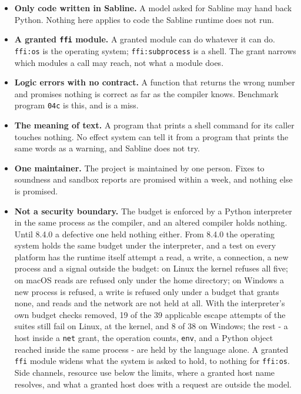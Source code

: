 \documentclass[
]{article}
\newcounter{none} %
\providecommand{\tightlist}{%
  \setlength{\itemsep}{0pt}\setlength{\parskip}{0pt}}
\begin{document}
\begin{itemize}
\tightlist
\item
  \textbf{Only code written in Sabline.} A model asked for Sabline may
  hand back Python. Nothing here applies to code the Sabline runtime
  does not run.
\item
  \textbf{A granted \texttt{ffi} module.} A granted module can do
  whatever it can do. \texttt{ffi:os} is the operating system;
  \texttt{ffi:subprocess} is a shell. The grant narrows which modules a
  call may reach, not what a module does.
\item
  \textbf{Logic errors with no contract.} A function that returns the
  wrong number and promises nothing is correct as far as the compiler
  knows. Benchmark program \texttt{04c} is this, and is a miss.
\item
  \textbf{The meaning of text.} A program that prints a shell command
  for its caller touches nothing. No effect system can tell it from a
  program that prints the same words as a warning, and Sabline does not
  try.
\item
  \textbf{One maintainer.} The project is maintained by one person.
  Fixes to soundness and sandbox reports are promised within a week, and
  nothing else is promised.
\item
  \textbf{Not a security boundary.} The budget is enforced by a Python
  interpreter in the same process as the compiler, and an altered
  compiler holds nothing. Until 8.4.0 a defective one held nothing
  either. From 8.4.0 the operating system holds the same budget under
  the interpreter, and a test on every platform has the runtime itself
  attempt a read, a write, a connection, a new process and a signal
  outside the budget: on Linux the kernel refuses all five; on macOS
  reads are refused only under the home directory; on Windows a new
  process is refused, a write is refused only under a budget that grants
  none, and reads and the network are not held at all. With the
  interpreter's own budget checks removed, 19 of the 39 applicable
  escape attempts of the suites still fail on Linux, at the kernel, and
  8 of 38 on Windows; the rest - a host inside a \texttt{net} grant, the
  operation counts, \texttt{env}, and a Python object reached inside the
  same process - are held by the language alone. A granted \texttt{ffi}
  module widens what the system is asked to hold, to nothing for
  \texttt{ffi:os}. Side channels, resource use below the limits, where a
  granted host name resolves, and what a granted host does with a
  request are outside the model.

\end{itemize}
\end{document}
